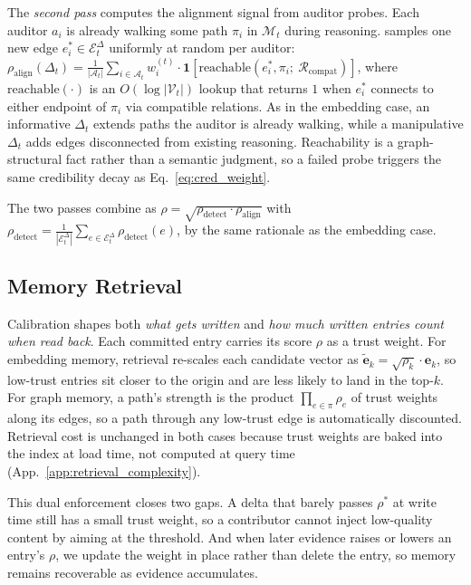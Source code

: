The \emph{second pass} computes the alignment signal from auditor
probes. Each auditor $a_i$ is already walking some path $\pi_i$ in
$\mathcal{M}_t$ during reasoning. \system samples one new edge
$e_i^* \in \mathcal{E}_t^\Delta$ uniformly at random per auditor:
\(
    \rho_{\text{align}}(\Delta_t) =
    \frac{1}{|\mathcal{A}_t|}
    \sum_{i \in \mathcal{A}_t}
    w_i^{(t)} \cdot
    \mathbf{1}\!\left[
        \text{reachable}(e_i^*, \pi_i;\ \mathcal{R}_{\text{compat}})
    \right]\), where $\text{reachable}(\cdot)$ is an $O(\log |\mathcal{V}_t|)$
lookup that returns $1$ when $e_i^*$ connects to either endpoint of
$\pi_i$ via compatible relations. As in the embedding case, an
informative $\Delta_t$ extends paths the auditor is already walking,
while a manipulative $\Delta_t$ adds edges disconnected from
existing reasoning. Reachability is a graph-structural fact rather
than a semantic judgment, so a failed probe triggers the same
credibility decay as Eq.~\ref{eq:cred_weight}.

The two passes combine as $\rho = \sqrt{\rho_{\text{detect}} \cdot
\rho_{\text{align}}}$ with $\rho_{\text{detect}} = \frac{1}{|\mathcal{E}_t^\Delta|}
\sum_{e \in \mathcal{E}_t^\Delta} \rho_{\text{detect}}(e)$, by the
same rationale as the embedding case.

\subsection{Memory Retrieval}
\label{ssec:retrieval}

Calibration shapes both \emph{what gets written} and \emph{how much
written entries count when read back}. Each committed entry carries
its score $\rho$ as a trust weight. For embedding memory, retrieval
re-scales each candidate vector as $\tilde{\mathbf{e}}_k =
\sqrt{\rho_k} \cdot \mathbf{e}_k$, so low-trust entries sit closer
to the origin and are less likely to land in the top-$k$. For graph
memory, a path's strength is the product $\prod_{e \in \pi} \rho_e$
of trust weights along its edges, so a path through any low-trust
edge is automatically discounted. Retrieval cost is unchanged in
both cases because trust weights are baked into the index at load
time, not computed at query time
(App.~\ref{app:retrieval_complexity}).

This dual enforcement closes two gaps. A delta that barely passes
$\rho^*$ at write time still has a small trust weight, so a
contributor cannot inject low-quality content by aiming at the
threshold. And when later evidence raises or lowers an entry's
$\rho$, we update the weight in place rather than delete the entry,
so memory remains recoverable as evidence accumulates.